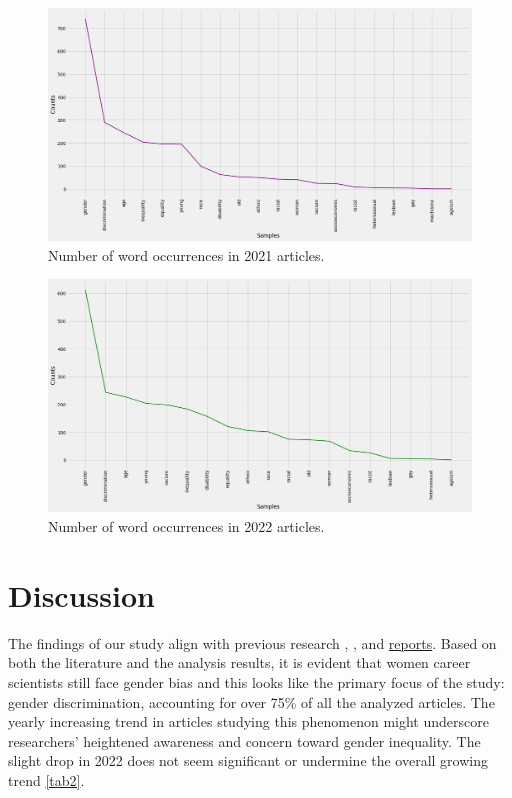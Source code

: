 \documentclass[runningheads]{llncs}
\begin{document}
\begin{figure}
\includegraphics[width=\textwidth]{2021.png}
\centering
\caption{Number of word occurrences in 2021 articles.} \label{fig:2021}
\end{figure}
\begin{figure}
\includegraphics[width=\textwidth]{2022.png}
\centering
\caption{Number of word occurrences in 2022 articles.} \label{fig:2022}
\end{figure}

\section{Discussion}
The findings of our study align with previous research \cite{Popova2021}, \cite{Silander2022}, and \href{https://www.unesco.org/en/articles/unesco-research-shows-women-career-scientists-still-face-gender-bias}{reports}. Based on both the literature and the analysis results, it is evident that women career scientists still face gender bias and this looks like the primary focus of the study: gender discrimination, accounting for over 75\% of all the analyzed articles. The yearly increasing trend in articles studying this phenomenon might underscore researchers' heightened awareness and concern toward gender inequality. The slight drop in 2022 does not seem significant or undermine the overall growing trend \ref{tab2}.
\end{document}
